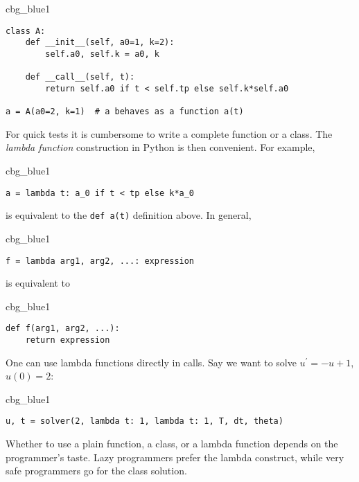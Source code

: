 \documentclass[graybox,sectrefs,envcountresetchap,open=right,final]{svmonodo}
\newenvironment{_cod_tight}[1]{
   \def\FrameCommand{\colorbox{#1}}
   \FrameRule0.6pt\MakeFramed {\FrameRestore}\vskip3mm}
   {\vskip0mm\endMakeFramed}
\newenvironment{cod}[1]{
\bgroup\rmfamily
\fboxsep=0mm\relax
\begin{_cod_tight}{#1}
\list{}{\parsep=-2mm\parskip=0mm\topsep=0pt\leftmargin=2mm
\rightmargin=2\leftmargin\leftmargin=4pt\relax}
\item\relax}
{\endlist\end{_cod_tight}\egroup}
\begin{document}
\begin{cod}{cbg_blue1}\begin{Verbatim}[numbers=none,fontsize=\fontsize{9pt}{9pt},baselinestretch=0.95,xleftmargin=2mm]
class A:
    def __init__(self, a0=1, k=2):
        self.a0, self.k = a0, k

    def __call__(self, t):
        return self.a0 if t < self.tp else self.k*self.a0

a = A(a0=2, k=1)  # a behaves as a function a(t)
\end{Verbatim}
\end{cod}
\noindent


For quick tests it is cumbersome to write a complete function or a class.
The \emph{lambda function} construction in Python is then convenient. For example,
\begin{cod}{cbg_blue1}\begin{Verbatim}[numbers=none,fontsize=\fontsize{9pt}{9pt},baselinestretch=0.95,xleftmargin=2mm]
a = lambda t: a_0 if t < tp else k*a_0
\end{Verbatim}
\end{cod}
\noindent
is equivalent to the \texttt{def a(t)} definition above. In general,
\begin{cod}{cbg_blue1}\begin{Verbatim}[numbers=none,fontsize=\fontsize{9pt}{9pt},baselinestretch=0.95,xleftmargin=2mm]
f = lambda arg1, arg2, ...: expression
\end{Verbatim}
\end{cod}
\noindent
is equivalent to
\begin{cod}{cbg_blue1}\begin{Verbatim}[numbers=none,fontsize=\fontsize{9pt}{9pt},baselinestretch=0.95,xleftmargin=2mm]
def f(arg1, arg2, ...):
    return expression
\end{Verbatim}
\end{cod}
\noindent
One can use lambda functions directly in calls. Say we want to
solve $u^{\prime}=-u+1$, $u(0)=2$:
\begin{cod}{cbg_blue1}\begin{Verbatim}[numbers=none,fontsize=\fontsize{9pt}{9pt},baselinestretch=0.95,xleftmargin=2mm]
u, t = solver(2, lambda t: 1, lambda t: 1, T, dt, theta)
\end{Verbatim}
\end{cod}
\noindent

Whether to use a plain function, a class, or a lambda function depends
on the programmer's taste. Lazy programmers prefer the lambda construct, while
very safe programmers go for the class solution.
\end{document}

